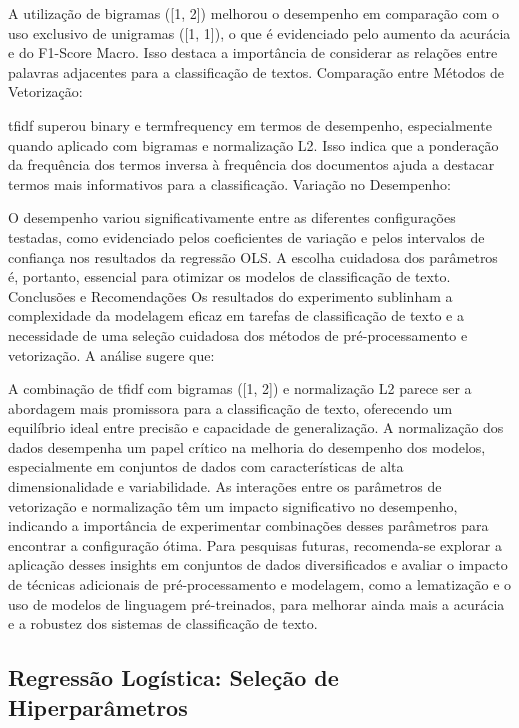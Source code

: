 A utilização de bigramas ([1, 2]) melhorou o desempenho em comparação com o uso exclusivo de unigramas ([1, 1]), o que é evidenciado pelo aumento da acurácia e do F1-Score Macro. Isso destaca a importância de considerar as relações entre palavras adjacentes para a classificação de textos.
Comparação entre Métodos de Vetorização:

tfidf superou binary e termfrequency em termos de desempenho, especialmente quando aplicado com bigramas e normalização L2. Isso indica que a ponderação da frequência dos termos inversa à frequência dos documentos ajuda a destacar termos mais informativos para a classificação.
Variação no Desempenho:

O desempenho variou significativamente entre as diferentes configurações testadas, como evidenciado pelos coeficientes de variação e pelos intervalos de confiança nos resultados da regressão OLS. A escolha cuidadosa dos parâmetros é, portanto, essencial para otimizar os modelos de classificação de texto.
Conclusões e Recomendações
Os resultados do experimento sublinham a complexidade da modelagem eficaz em tarefas de classificação de texto e a necessidade de uma seleção cuidadosa dos métodos de pré-processamento e vetorização. A análise sugere que:

A combinação de tfidf com bigramas ([1, 2]) e normalização L2 parece ser a abordagem mais promissora para a classificação de texto, oferecendo um equilíbrio ideal entre precisão e capacidade de generalização.
A normalização dos dados desempenha um papel crítico na melhoria do desempenho dos modelos, especialmente em conjuntos de dados com características de alta dimensionalidade e variabilidade.
As interações entre os parâmetros de vetorização e normalização têm um impacto significativo no desempenho, indicando a importância de experimentar combinações desses parâmetros para encontrar a configuração ótima.
Para pesquisas futuras, recomenda-se explorar a aplicação desses insights em conjuntos de dados diversificados e avaliar o impacto de técnicas adicionais de pré-processamento e modelagem, como a lematização e o uso de modelos de linguagem pré-treinados, para melhorar ainda mais a acurácia e a robustez dos sistemas de classificação de texto.



\subsection*{Regressão Logística: Seleção de Hiperparâmetros}

